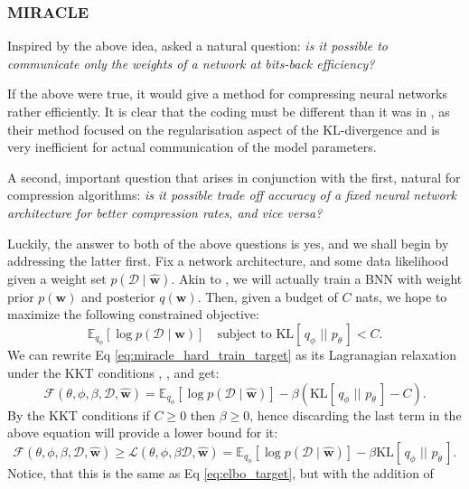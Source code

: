 \documentclass{article}
\renewcommand{\vec}[1]{\mathbf{#1}}
\newcommand{\F}{\mathcal{F}}
\renewcommand{\L}{\mathcal{L}}
\newcommand{\KL}[2]{\mathrm{KL}[\,#1\,\,||\,\,#2\,]}
\newcommand{\Exp}{\mathbb{E}}
\newcommand{\Data}{\mathcal{D}}
\begin{document}
\subsubsection{MIRACLE}
\label{sec:miracle_theory}
Inspired by the above idea, \cite{havasi2018minimal} asked a natural question:
\textit{is it possible to communicate only the weights of a network at
  bits-back efficiency?}
\par
If the above were true, it would give a method for compressing neural networks
rather efficiently. It is clear that the coding must be different than it was in
\cite{hinton1993keeping}, as their method focused on the regularisation aspect
of the KL-divergence and is very inefficient for actual communication of the
model parameters.
\par
A second, important question that arises in conjunction with the first, natural
for compression algorithms:
\textit{is it possible trade off accuracy of a fixed neural network architecture
  for better compression rates, and vice versa?}
\par
Luckily, the answer to both of the above questions is yes, and we shall begin by
addressing the latter first. Fix a network architecture, and some data
likelihood given a weight set $p(\Data \mid \vec{\hat{w}})$. Akin to
\cite{hinton1993keeping}, we will actually train a BNN with weight prior
$p(\vec{w})$ and posterior $q(\vec{w})$. Then, given a budget of $C$ nats, we
hope to maximize the following constrained objective:
\begin{equation}
\label{eq:miracle_hard_train_target}
\Exp_{q_\phi}[\log p(\Data \mid \vec{w})] \quad \text{subject to }
\KL{q_{\phi}}{p_{\theta}} < C.
\end{equation}
We can rewrite Eq \ref{eq:miracle_hard_train_target} as its Lagranagian
relaxation under the KKT conditions \cite{karush2014minima},
\cite{kuhn2014nonlinear}, \cite{higgins2017beta} and get:
\[
  \F(\theta, \phi, \beta, \Data, \vec{\hat{w}}) = 
  \Exp_{q_\phi}[\log p(\Data \mid \vec{\hat{w}})] - \beta (\KL{q_{\phi}}{p_{\theta}} - C).
\]
By the KKT conditions if $C \geq 0$ then $\beta \geq 0$, hence discarding the last
term in the above equation will provide a lower bound for it:
\begin{equation}
\label{eq:miracle_train_target}
\F(\theta, \phi, \beta, \Data, \vec{\hat{w}}) \geq
\L(\theta, \phi, \beta \Data, \vec{\hat{w}}) =
\Exp_{q_\phi}[\log p(\Data \mid \vec{\hat{w}})] - \beta \KL{q_{\phi}}{p_{\theta}}.
\end{equation}
Notice, that this is the same as Eq \ref{eq:elbo_target}, but with the addition of
\end{document}
